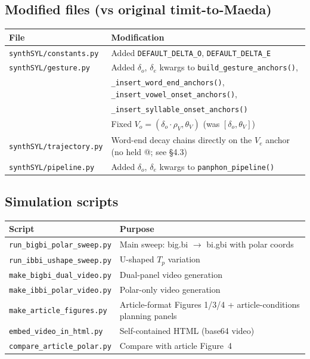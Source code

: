 \documentclass[11pt,a4paper]{article}
\begin{document}
\subsection{Modified files (vs original timit-to-Maeda)}

\begin{center}
\begin{tabular}{@{}l p{}@{}}
\toprule
\textbf{File} & \textbf{Modification} \\
\midrule
\texttt{synthSYL/constants.py} & Added \texttt{DEFAULT\_DELTA\_O},
  \texttt{DEFAULT\_DELTA\_E} \\
\texttt{synthSYL/gesture.py} & Added $\delta_o$, $\delta_e$ kwargs
  to \texttt{build\_gesture\_anchors()}, \\
  & \texttt{\_insert\_word\_end\_anchors()},
  \texttt{\_insert\_vowel\_onset\_anchors()}, \\
  & \texttt{\_insert\_syllable\_onset\_anchors()} \\
  & Fixed $V_o = (\delta_o \cdot \rho_V, \theta_V)$
  (was $[\delta_o, \theta_V]$) \\
\texttt{synthSYL/trajectory.py} & Word-end decay chains directly on
  the $V_e$ anchor (no held @; see \S4.3) \\
\texttt{synthSYL/pipeline.py} & Added $\delta_o$, $\delta_e$ kwargs
  to \texttt{panphon\_pipeline()} \\
\bottomrule
\end{tabular}
\end{center}

\subsection{Simulation scripts}

\begin{center}
\begin{tabular}{@{}l p{}@{}}
\toprule
\textbf{Script} & \textbf{Purpose} \\
\midrule
\texttt{run\_bigbi\_polar\_sweep.py} & Main sweep: big.bi $\to$ bi.gbi
  with polar coords \\
\texttt{run\_ibbi\_ushape\_sweep.py} & U-shaped $T_p$ variation \\
\texttt{make\_bigbi\_dual\_video.py} & Dual-panel video generation \\
\texttt{make\_ibbi\_polar\_video.py} & Polar-only video generation \\
\texttt{make\_article\_figures.py} & Article-format Figures 1/3/4 +
  article-conditions planning panels \\
\texttt{embed\_video\_in\_html.py} & Self-contained HTML (base64 video) \\
\texttt{compare\_article\_polar.py} & Compare with article Figure~4 \\
\bottomrule
\end{tabular}
\end{center}
\end{document}
